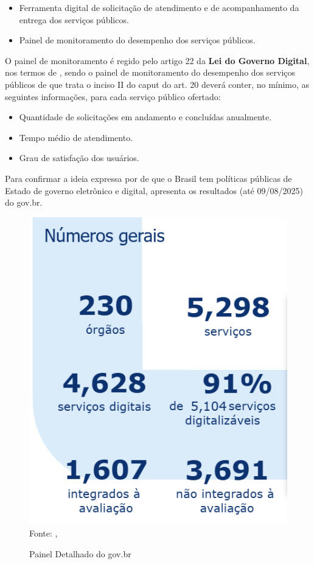 \begin{itemize}
    \item Ferramenta digital de solicitação de atendimento e de acompanhamento da entrega dos serviços públicos.
    \item Painel de monitoramento do desempenho dos serviços públicos.
\end{itemize}

O painel de monitoramento é regido pelo artigo 22 da \textbf{Lei do Governo Digital}, nos termos de \cite{l14129}, sendo o painel de monitoramento do desempenho dos serviços públicos de que trata o inciso II do caput do art. 20 deverá conter, no mínimo, as seguintes informações, para cada serviço público ofertado:

\begin{itemize}
    \item Quantidade de solicitações em andamento e concluídas anualmente.
    \item Tempo médio de atendimento.
    \item Grau de satisfação dos usuários.
\end{itemize}

Para confirmar a ideia expressa por \cite{mitkiewicz2024transformaccao} de que o Brasil tem políticas públicas de Estado de governo eletrônico e digital, \cite{painel_completo_monitoramento_govbr} apresenta os resultados (até 09/08/2025) do gov.br.

\begin{figure}[H]
    \centering
    \caption{Painel Detalhado do gov.br}
    \includegraphics[width=0.5\linewidth]{figuras/painel_govbr.PNG}
    \label{fig:placeholder}
    \\ \footnotesize{Fonte: \cite{painel_completo_monitoramento_govbr},}
\end{figure}

